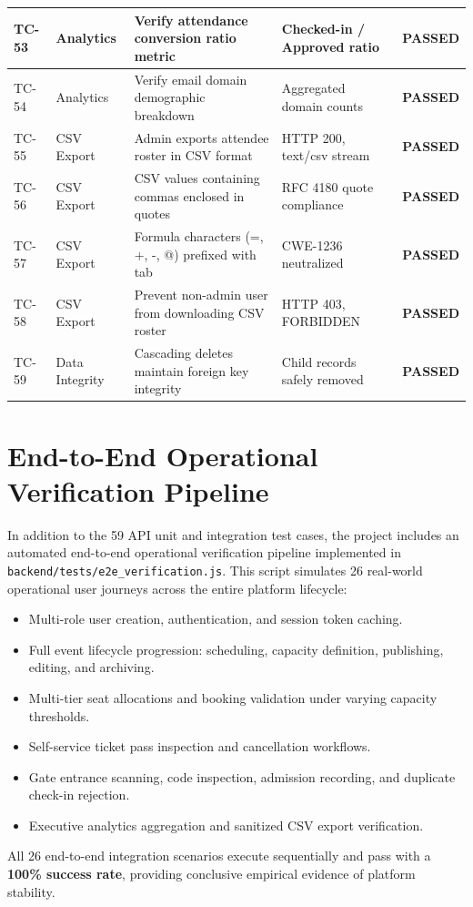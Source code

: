 \documentclass[11pt,a4paper]{report}
\begin{document}
\begin{table}[H]
\begin{tabularx}{\textwidth}{|p{}|p{}|p{}|p{}|X|}
TC-53 & Analytics & Verify attendance conversion ratio metric & Checked-in / Approved ratio & \color{SuccessGreen}\textbf{PASSED} \\\hline
TC-54 & Analytics & Verify email domain demographic breakdown & Aggregated domain counts & \color{SuccessGreen}\textbf{PASSED} \\\hline
TC-55 & CSV Export & Admin exports attendee roster in CSV format & HTTP 200, text/csv stream & \color{SuccessGreen}\textbf{PASSED} \\\hline
TC-56 & CSV Export & CSV values containing commas enclosed in quotes & RFC 4180 quote compliance & \color{SuccessGreen}\textbf{PASSED} \\\hline
TC-57 & CSV Export & Formula characters (=, +, -, @) prefixed with tab & CWE-1236 neutralized & \color{SuccessGreen}\textbf{PASSED} \\\hline
TC-58 & CSV Export & Prevent non-admin user from downloading CSV roster & HTTP 403, FORBIDDEN & \color{SuccessGreen}\textbf{PASSED} \\\hline
TC-59 & Data Integrity & Cascading deletes maintain foreign key integrity & Child records safely removed & \color{SuccessGreen}\textbf{PASSED} \\\hline
\end{tabularx}
\end{table}

\section{End-to-End Operational Verification Pipeline}
\justifying
In addition to the 59 API unit and integration test cases, the project includes an automated end-to-end operational verification pipeline implemented in \texttt{backend/tests/e2e\_verification.js}. This script simulates 26 real-world operational user journeys across the entire platform lifecycle:
\begin{itemize}[leftmargin=1.5em, itemsep=0.3em]
    \item Multi-role user creation, authentication, and session token caching.
    \item Full event lifecycle progression: scheduling, capacity definition, publishing, editing, and archiving.
    \item Multi-tier seat allocations and booking validation under varying capacity thresholds.
    \item Self-service ticket pass inspection and cancellation workflows.
    \item Gate entrance scanning, code inspection, admission recording, and duplicate check-in rejection.
    \item Executive analytics aggregation and sanitized CSV export verification.
\end{itemize}
All 26 end-to-end integration scenarios execute sequentially and pass with a \textbf{100\% success rate}, providing conclusive empirical evidence of platform stability.
\end{document}
